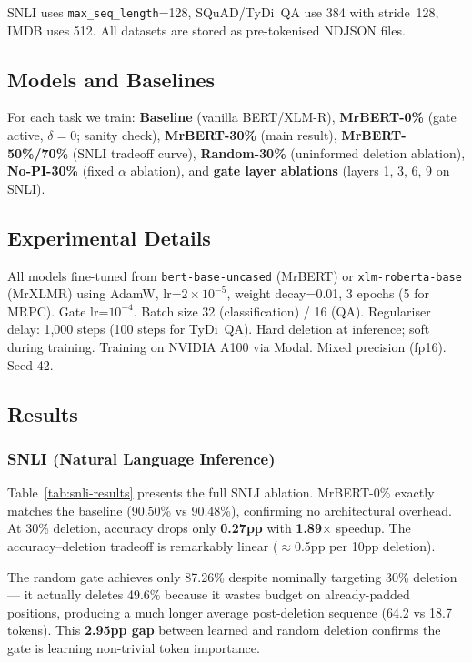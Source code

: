 \documentclass[11pt,a4paper]{article}
\begin{document}
SNLI uses \texttt{max\_seq\_length}=128, SQuAD/TyDi~QA use 384 with stride~128, IMDB uses 512. All datasets are stored as pre-tokenised NDJSON files.


\subsection{Models and Baselines}

For each task we train: \textbf{Baseline} (vanilla BERT/XLM-R), \textbf{MrBERT-0\%} (gate active, $\delta=0$; sanity check), \textbf{MrBERT-30\%} (main result), \textbf{MrBERT-50\%/70\%} (SNLI tradeoff curve), \textbf{Random-30\%} (uninformed deletion ablation), \textbf{No-PI-30\%} (fixed $\alpha$ ablation), and \textbf{gate layer ablations} (layers 1, 3, 6, 9 on SNLI).


\subsection{Experimental Details}

All models fine-tuned from \texttt{bert-base-uncased} (MrBERT) or \texttt{xlm-roberta-base} (MrXLMR) using AdamW, lr=$2\times10^{-5}$, weight decay=0.01, 3 epochs (5 for MRPC). Gate lr=$10^{-4}$. Batch size 32 (classification) / 16 (QA). Regulariser delay: 1,000 steps (100 steps for TyDi~QA). Hard deletion at inference; soft during training. Training on NVIDIA A100 via Modal. Mixed precision (fp16). Seed 42.


\subsection{Results}

\subsubsection{SNLI (Natural Language Inference)}
\label{sec:results-snli}

Table~\ref{tab:snli-results} presents the full SNLI ablation. MrBERT-0\% exactly matches the baseline (90.50\% vs 90.48\%), confirming no architectural overhead. At 30\% deletion, accuracy drops only \textbf{0.27pp} with \textbf{1.89$\times$} speedup. The accuracy--deletion tradeoff is remarkably linear ($\approx$0.5pp per 10pp deletion).

The random gate achieves only 87.26\% despite nominally targeting 30\% deletion --- it actually deletes 49.6\% because it wastes budget on already-padded positions, producing a much longer average post-deletion sequence (64.2 vs 18.7 tokens). This \textbf{2.95pp gap} between learned and random deletion confirms the gate is learning non-trivial token importance.
\end{document}
